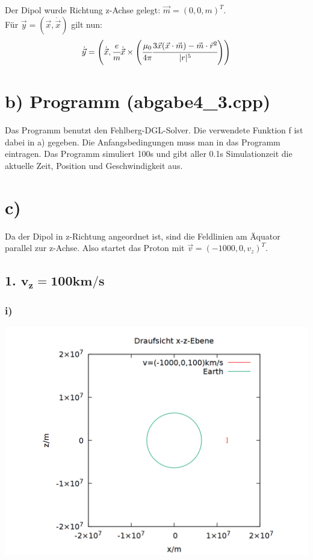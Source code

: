 \documentclass{scrreprt}
\begin{document}
Der Dipol wurde Richtung z-Achse gelegt: $\vec{m} = (0,0,m)^T$.\\

Für $\vec{y} = (\vec{x},\dot{\vec{x}})$ gilt nun:\\
\begin{align}
\dot{\vec{y}} = \left(\dot{\vec{x}},  \cfrac{e}{m}\dot{\vec{x}} \times \left(\cfrac{\mu_0}{4\pi}\cfrac{3\vec{x}(\vec{x} \cdot \vec{m}) - \vec{m}\cdot\vec{r}^2}{|r|^5}\right)\right)  
\end{align}

\section*{b) Programm (abgabe4\_3.cpp)}
Das Programm benutzt den Fehlberg-DGL-Solver. Die verwendete Funktion f ist dabei in a) gegeben. Die Anfangsbedingungen muss man in das Programm eintragen. Das Programm simuliert 100s und gibt aller 0.1s Simulationzeit die aktuelle Zeit, Position und Geschwindigkeit aus.  

\section*{c)}
Da der Dipol in z-Richtung angeordnet ist, sind die Feldlinien am Äquator parallel zur z-Achse. Also startet das Proton mit $\vec{v} = (-1000,0,v_z)^T$.
\subsection*{1. $\mathbf{v_z = 100km/s}$}
\subsubsection*{i)}
\begin{center}
\includegraphics[scale=0.25]{plot_1_i.png}
\end{center}
\end{document}
